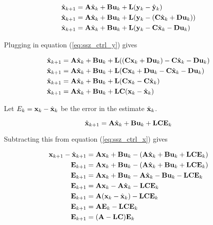\begin{align*}
  \hat{\mathbf{x}}_{k+1} &= \mathbf{A}\hat{\mathbf{x}}_k + \mathbf{B}\mathbf{u}_k +
    \mathbf{L} (\mathbf{y}_k - \hat{\mathbf{y}}_k) \\
  \hat{\mathbf{x}}_{k+1} &= \mathbf{A}\hat{\mathbf{x}}_k + \mathbf{B}\mathbf{u}_k +
    \mathbf{L} (\mathbf{y}_k - (\mathbf{C}\hat{\mathbf{x}}_k + \mathbf{D}\mathbf{u}_k)) \\
  \hat{\mathbf{x}}_{k+1} &= \mathbf{A}\hat{\mathbf{x}}_k + \mathbf{B}\mathbf{u}_k +
    \mathbf{L} (\mathbf{y}_k - \mathbf{C}\hat{\mathbf{x}}_k - \mathbf{D}\mathbf{u}_k)
\end{align*}

Plugging in equation (\ref{eq:ssz_ctrl_y}) gives

\begin{align*}
  \hat{\mathbf{x}}_{k+1} &= \mathbf{A}\hat{\mathbf{x}}_k + \mathbf{B}\mathbf{u}_k +
    \mathbf{L}((\mathbf{C}\mathbf{x}_k + \mathbf{D}\mathbf{u}_k) - \mathbf{C}\hat{\mathbf{x}}_k -
    \mathbf{D}\mathbf{u}_k) \\
  \hat{\mathbf{x}}_{k+1} &= \mathbf{A}\hat{\mathbf{x}}_k + \mathbf{B}\mathbf{u}_k +
    \mathbf{L}(\mathbf{C}\mathbf{x}_k + \mathbf{D}\mathbf{u}_k - \mathbf{C}\hat{\mathbf{x}}_k -
    \mathbf{D}\mathbf{u}_k) \\
  \hat{\mathbf{x}}_{k+1} &= \mathbf{A}\hat{\mathbf{x}}_k + \mathbf{B}\mathbf{u}_k +
    \mathbf{L}(\mathbf{C}\mathbf{x}_k - \mathbf{C}\hat{\mathbf{x}}_k) \\
  \hat{\mathbf{x}}_{k+1} &= \mathbf{A}\hat{\mathbf{x}}_k + \mathbf{B}\mathbf{u}_k +
    \mathbf{L}\mathbf{C}(\mathbf{x}_k - \hat{\mathbf{x}}_k)
\end{align*}

Let $E_k = \mathbf{x}_k - \hat{\mathbf{x}}_k$ be the error in the estimate
$\hat{\mathbf{x}}_k$.

\begin{equation*}
  \hat{\mathbf{x}}_{k+1} = \mathbf{A}\hat{\mathbf{x}}_k + \mathbf{B}\mathbf{u}_k +
    \mathbf{L}\mathbf{C}\mathbf{E}_k
\end{equation*}

Subtracting this from equation (\ref{eq:ssz_ctrl_x}) gives

\begin{align}
  \mathbf{x}_{k+1} - \hat{\mathbf{x}}_{k+1} &= \mathbf{A}\mathbf{x}_k + \mathbf{B}\mathbf{u}_k -
    (\mathbf{A}\hat{\mathbf{x}}_k + \mathbf{B}\mathbf{u}_k +
     \mathbf{L}\mathbf{C}\mathbf{E}_k) \nonumber \\
  \mathbf{E}_{k+1} &= \mathbf{A}\mathbf{x}_k + \mathbf{B}\mathbf{u}_k -
    (\mathbf{A}\hat{\mathbf{x}}_k + \mathbf{B}\mathbf{u}_k + \mathbf{L}\mathbf{C}\mathbf{E}_k)
    \nonumber \\
  \mathbf{E}_{k+1} &= \mathbf{A}\mathbf{x}_k + \mathbf{B}\mathbf{u}_k -
    \mathbf{A}\hat{\mathbf{x}}_k - \mathbf{B}\mathbf{u}_k - \mathbf{L}\mathbf{C}\mathbf{E}_k
    \nonumber \\
  \mathbf{E}_{k+1} &= \mathbf{A}\mathbf{x}_k - \mathbf{A}\hat{\mathbf{x}}_k -
    \mathbf{L}\mathbf{C}\mathbf{E}_k \nonumber \\
  \mathbf{E}_{k+1} &= \mathbf{A}(\mathbf{x}_k - \hat{\mathbf{x}}_k) -
    \mathbf{L}\mathbf{C}\mathbf{E}_k \nonumber \\
  \mathbf{E}_{k+1} &= \mathbf{A}\mathbf{E}_k - \mathbf{L}\mathbf{C}\mathbf{E}_k \nonumber \\
  \mathbf{E}_{k+1} &= (\mathbf{A} - \mathbf{L}\mathbf{C})\mathbf{E}_k \label{eq:obsv_eig_calc}
\end{align}


